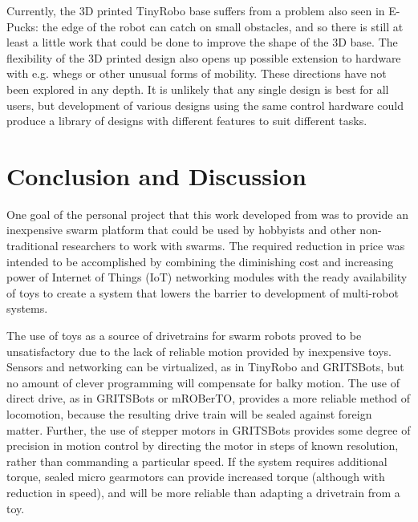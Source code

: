 Currently, the 3D printed TinyRobo base suffers from a problem also seen in E-Pucks: the edge of the robot can catch on small obstacles, and so there is still at least a little work that could be done to improve the shape of the 3D base. 
The flexibility of the 3D printed design also opens up possible extension to hardware with e.g. whegs or other unusual forms of mobility. 
These directions have not been explored in any depth.
It is unlikely that any single design is best for all users, but development of various designs using the same control hardware could produce a library of designs with different features to suit different tasks. 


\section{Conclusion and Discussion}

One goal of the personal project that this work developed from was to provide an inexpensive swarm platform that could be used by hobbyists and other non-traditional researchers to work with swarms. 
The required reduction in price was intended to be accomplished by combining the diminishing cost and increasing power of Internet of Things (IoT) networking modules with the ready availability of toys to create a system that lowers the barrier to development of multi-robot systems.

The use of toys as a source of drivetrains for swarm robots proved to be unsatisfactory due to the lack of reliable motion provided by inexpensive toys.
Sensors and networking can be virtualized, as in TinyRobo and GRITSBots, but no amount of clever programming will compensate for balky motion. 
The use of direct drive, as in GRITSBots or mROBerTO, provides a more reliable method of locomotion, because the resulting drive train will be sealed against foreign matter. 
Further, the use of stepper motors in GRITSBots provides some degree of precision in motion control by directing the motor in steps of known resolution, rather than commanding a particular speed. 
If the system requires additional torque, sealed micro gearmotors can provide increased torque (although with reduction in speed), and will be more reliable than adapting a drivetrain from a toy. 
 
